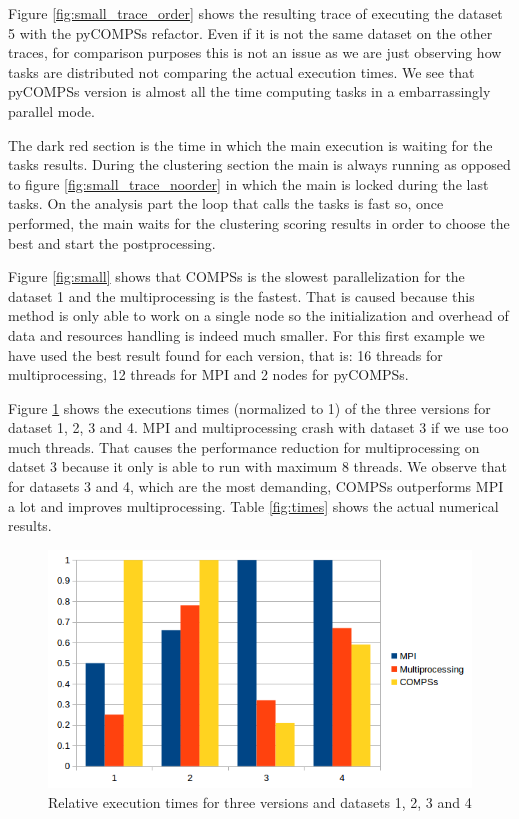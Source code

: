Figure \ref{fig:small_trace_order} shows the resulting trace of executing the dataset 5 with the pyCOMPSs refactor.  Even if it is not the same dataset on the other traces, for comparison purposes this is not an issue as we are just observing how tasks are distributed not comparing the actual execution times.  We see that pyCOMPSs version is almost all the time computing tasks in a embarrassingly parallel mode. 

The dark red section is the time in which the main execution is waiting for the tasks results. During the clustering section the main is always running as opposed to figure \ref{fig:small_trace_noorder} in which the main is locked during the last tasks. On the analysis part the loop that calls the tasks is fast so, once performed, the main waits for the clustering scoring results in order to choose the best and start the postprocessing.


Figure \ref{fig:small} shows that COMPSs is the slowest parallelization for the dataset 1 and the multiprocessing is the fastest. That is caused because this method is only able to work on a single node so the initialization and overhead of data and resources handling is indeed much smaller. For this first example we have used the best result found for each version, that is: 16 threads for multiprocessing, 12 threads for MPI and 2 nodes for pyCOMPSs.

 Figure \ref{fig:graph} shows the executions times (normalized to 1) of the three versions for dataset 1, 2, 3 and 4. MPI and multiprocessing crash with dataset 3 if we use too much threads. That causes the performance reduction for multiprocessing on datset 3 because it only is able to run with maximum 8 threads. We observe that for  datasets 3 and 4, which are the most demanding, COMPSs outperforms MPI a lot and improves multiprocessing. Table \ref{fig:times} shows the actual numerical results.


\begin{figure}[h]
\centering
\includegraphics[scale=0.85]{img/graph.png}
\caption{Relative execution times for three versions and datasets 1, 2, 3 and 4}
\label{fig:graph}
\end{figure}

